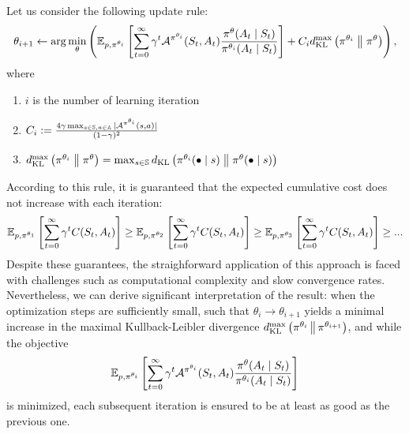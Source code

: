 \documentclass[12pt,twoside]{../../mitthesis}
\begin{document}
Let us consider the following update rule:
$$
    \theta_{i + 1} \la \arg\min_{\theta} \left( \E[\transit, \policy^{\theta_i}]{\sum_{t=0}^{\infty} \gamma ^ t \Advan^{\policy^{\theta_i}}(\State_t, \Action_t)   \frac{\policy^{\theta}(\Action_t \mid \State_t)}{\policy^{\theta_i}(\Action_t \mid \State_t)}} + C_i d_{\text{KL}}^{\max}\left(\policy^{\theta_i}\;\middle\|\;\policy^{\theta}\right) \right), 
$$
where 
\begin{enumerate}
    \item $i$ is the number of learning iteration
    \item $C_i := \frac{4 \gamma\max_{s \in \states, a \in \actions}|\Advan^{\policy^{\theta_i}}(s, a)|}{(1 - \gamma)^2}$
    \item $d_{\text{KL}}^{\max}\left(\policy^{\theta_i}\;\middle\|\;\policy^{\theta}\right)  = \max_{\state \in \states}\kldiv{\policy^{\theta_i}(\bullet \mid s)}{\policy^{\theta}(\bullet \mid s)}$
\end{enumerate}
According to this rule, it is guaranteed that the expected cumulative cost does not increase with each iteration:
$$
\E[\transit, \policy^{\theta_1}]{\sum_{t = 0}^{\infty} \gamma ^ t \Cost(\State_{t}, \Action_{t})} \geq \E[\transit, \policy^{\theta_2}]{\sum_{t = 0}^{\infty} \gamma ^ t \Cost(\State_{t}, \Action_{t})} \geq \E[\transit, \policy^{\theta_3}]{\sum_{t = 0}^{\infty} \gamma ^ t \Cost(\State_{t}, \Action_{t})} \geq ...
$$
Despite these guarantees, the straighforward application of this approach is faced with challenges such as computational complexity and slow convergence rates.
Nevertheless, we can derive significant interpretation of the result: when the optimization steps are sufficiently small, such that $\theta_i \rightarrow \theta_{i+1}$ yields a minimal increase in the maximal Kullback-Leibler divergence $d_{\text{KL}}^{\max}\left(\policy^{\theta_i} \,\middle\|\, \policy^{\theta_{i + 1}}\right)$, and while the objective 
\[
    \E[\transit, \policy^{\theta_i}]{\sum_{t=0}^{\infty} \gamma ^ t \Advan^{\policy^{\theta_i}}(\State_t, \Action_t)   \frac{\policy^{\theta}(\Action_t \mid \State_t)}{\policy^{\theta_i}(\Action_t \mid \State_t)}}
\]
is minimized, each subsequent iteration is ensured to be at least as good as the previous one.
\end{document}
